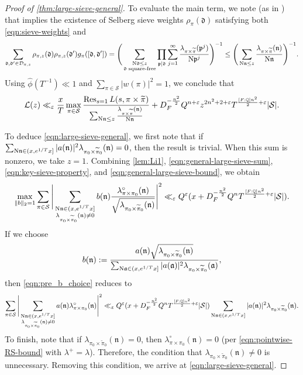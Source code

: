 \documentclass[11pt]{amsart}
\theoremstyle{remark}
\numberwithin{equation}{section}
\newcommand{\ka}{\mathfrak{a}}
\renewcommand{\d}{\mathfrak{d}}
\newcommand{\p}{\mathfrak{p}}
\newcommand{\n}{\mathfrak{n}}
\newcommand{\kn}{\mathfrak{n}}
\newcommand{\N}{\textnormal{N}}
\newcommand{\Q}{\mathbb{Q}}
\newcommand{\mD}{\mathcal{D}}
\newcommand{\mL}{\mathcal{L}}
\newcommand{\mS}{\mathcal{S}}
\newcommand{\eps}{\varepsilon}
\renewcommand{\hat}{\widehat}
\renewcommand{\tilde}{\widetilde}
\newcommand{\Res}{\textnormal{Res}}
\renewcommand{\epsilon}{\varepsilon}
\begin{document}
\begin{proof}[Proof of \cref{thm:large-sieve-general}]
To evaluate the main term, we note (as in \cite[p.\,15]{TZ_GLn}) that \cite[Theorem 7.1]{friedlander2010opera} implies the existence of Selberg sieve weights $\rho_\pi(\d)$ satisfying both \eqref{eqn:sieve-weights} and
\[
\begin{aligned}
    \sum_{\d, \d' \in \mD_{\pi,z}} \rho_{\pi,z}(\d) \rho_{\pi,z}(\d') g_\pi([\d,\d'])=
    \Bigg(\sum_{\substack{\N \d \le z \\ \d \text{ square-free}}} \prod_{\p \mid \d} \sum_{j = 1}^\infty \frac{\lambda_{\pi \times \tilde\pi}(\p^j)}{\N \p^j}\Bigg)^{-1}
    \le 
    \Bigg(\sum_{\N \n \le z} \frac{\lambda_{\pi \times \tilde\pi}(\n)}{\N \n}\Bigg)^{-1}.
\end{aligned}
\]
Using $\hat\phi(T^{-1}) \ll 1$ and $\sum_{\pi \in \mS} |w(\pi)|^2 = 1$, we conclude that
\begin{equation}
\label{eqn:general-large-sieve-bound}
    \mL(z) \ll_{\epsilon} \frac{x}{T} \max_{\pi \in \mS} \frac{\mathop{\Res}_{s = 1} L(s, \pi \times \tilde\pi)}{\sum_{\N \n \le z} \frac{\lambda_{\pi \times \tilde\pi}(\n)}{\N \n}}
    +
    D_F^{-\frac{n^2}{2}}Q^{n+\eps} z^{2n^2+2+\eps} T^{\frac{[F:\Q]n^2}{2}+\epsilon} |\mS|.
\end{equation}

To deduce \eqref{eqn:large-sieve-general}, we first note that if $\sum_{\N \n \in (x, e^{1/T}x]} |a(\n)|^2 \lambda_{\pi_0 \times \tilde\pi_0}(\n)=0$, then the result is trivial.  When this sum is nonzero, we take $z=1$. Combining \cref{lem:Li1}, \eqref{eqn:general-large-sieve-sum}, \eqref{eqn:key-sieve-property}, and \eqref{eqn:general-large-sieve-bound}, we obtain
\begin{equation}
\label{eqn:pre_b_choice}
    \max_{\|b\|_2 = 1} \sum_{\pi \in \mS}
    \Bigg| \sum_{\substack{\N \n \in (x, e^{1/T}x] \\ \lambda_{\pi_0 \times \tilde\pi_0}(\n) \neq 0}} b(\n) \frac{\lambda^\circ_{\pi \times \pi_0}(\n)}{\sqrt{\lambda_{\pi_0 \times \tilde\pi_0}(\n)}} \Bigg|^2
    \ll_{\epsilon} Q^\eps (x + D_F^{-\frac{n^2}{2}}Q^n T^{\frac{[F:\Q]n^2}{2}+\epsilon}|\mS|).
\end{equation}
If we choose
\[
    b(\n) := \frac{a(\n) \sqrt{\lambda_{\pi_0 \times \tilde\pi_0}(\n)}}{\sum_{\N \ka \in (x, e^{1/T}x]} |a(\ka)|^2 \lambda_{\pi_0 \times \tilde\pi_0}(\ka)},
\]
then \eqref{eqn:pre_b_choice} reduces to
\[
   \sum_{\pi \in \mS}
    \Bigg| \sum_{\substack{\N \n \in (x, e^{1/T}x] \\ \lambda_{\pi_0 \times \tilde\pi_0}(\n) \neq 0}} a(\n) \lambda^\circ_{\pi \times \pi_0}(\n) \Bigg|^2
    \ll_{\epsilon} Q^\eps (x + D_F^{-\frac{n^2}{2}}Q^n T^{\frac{[F:\Q]n^2}{2}+\epsilon}|\mS|)\sum_{\N \n \in (x, e^{1/T}x]} |a(\n)|^2 \lambda_{\pi_0 \times \tilde\pi_0}(\n).
\]
To finish, note that if $\lambda_{\pi_0 \times \tilde\pi_0}(\kn) = 0$, then $\lambda^\circ_{\pi \times \pi_0}(\n) = 0$ (per \eqref{eqn:pointwise-RS-bound} with $\lambda^+ = \lambda$).  Therefore, the condition that $\lambda_{\pi_0\times\tilde{\pi}_0}(\kn)\neq 0$ is unnecessary.  Removing this condition, we arrive at \eqref{eqn:large-sieve-general}.


\end{proof}
\end{document}
